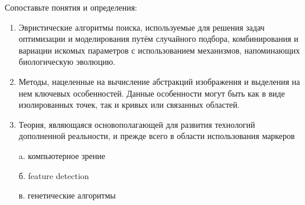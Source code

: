 
Сопоставьте понятия и определения:

        \begin{enumerate}
            \item Эвристические алгоритмы поиска, используемые для решения задач оптимизации и моделирования путём случайного подбора, комбинирования и вариации искомых параметров с использованием механизмов, напоминающих биологическую эволюцию.
            \item Методы, нацеленные на вычисление абстракций изображения и выделения на нем ключевых особенностей. Данные особенности могут быть как в виде изолированных точек, так и кривых или связанных областей.
            \item Теория, являющаяся основополагающей для развития технологий дополненной реальности, и прежде всего в области использования маркеров
        \end{enumerate}

        \begin{enumerate}
            \item[a.] компьютерное зрение
            \item[б.] feature detection
            \item[в.] генетические алгоритмы
        \end{enumerate}